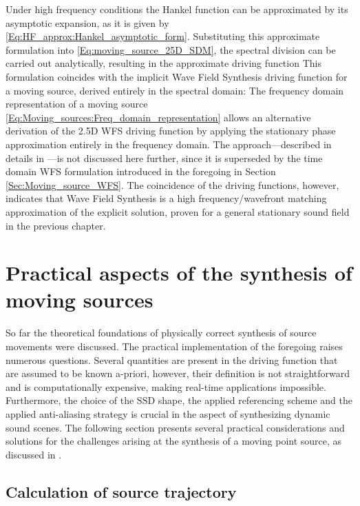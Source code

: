 Under high frequency conditions the Hankel function can be approximated by its asymptotic expansion, as it is given by \eqref{Eq:HF_approx:Hankel_asymptotic_form}.
Substituting this approximate formulation into \eqref{Eq:moving_source_25D_SDM}, the spectral division can be carried out analytically, resulting in the approximate driving function
This formulation coincides with the implicit Wave Field Synthesis driving function for a moving source, derived entirely in the spectral domain: 
The frequency domain representation of a moving source \eqref{Eq:Moving_sources:Freq_domain_representation} allows an alternative derivation of the 2.5D WFS driving function by applying the stationary phase approximation entirely in the frequency domain.
The approach---described in details in \cite{firtha2015sound}---is not discussed here further, since it is superseded by the time domain WFS formulation introduced in the foregoing in Section \ref{Sec:Moving_source_WFS}.
The coincidence of the driving functions, however, indicates that Wave Field Synthesis is a high frequency/wavefront matching approximation of the explicit solution, proven for a general stationary sound field in the previous chapter.

\section{Practical aspects of the synthesis of moving sources}

So far the theoretical foundations of physically correct synthesis of source movements were discussed.
The practical implementation of the foregoing raises numerous questions.
Several quantities are present in the driving function that are assumed to be known a-priori, however, their definition is not straightforward and is computationally expensive, making real-time applications impossible.
Furthermore, the choice of the SSD shape, the applied referencing scheme and the applied anti-aliasing strategy is crucial in the aspect of synthesizing dynamic sound scenes.
The following section presents several practical considerations and solutions for the challenges arising at the synthesis of a moving point source, as discussed in  \cite{Firtha2018_daga_moving_source}.

\subsection{Calculation of source trajectory}
\label{Sec:Trajectory_calc}

